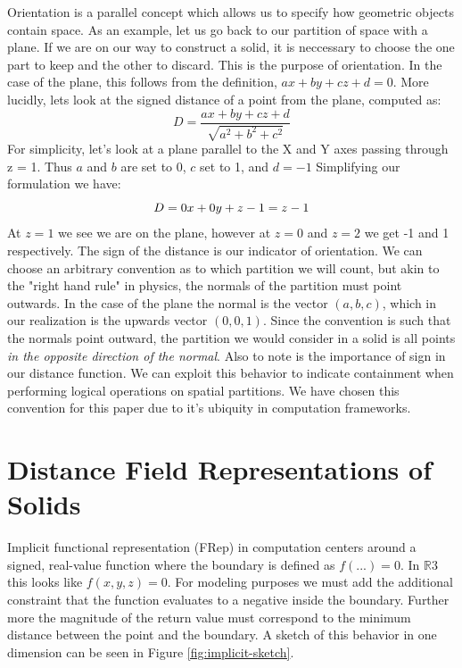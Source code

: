 Orientation is a parallel concept which allows us to specify how geometric
objects contain space. As an example, let us go back to our partition of
space with a plane. If we are on our way to construct a solid, it is
neccessary to choose the one part to keep and the other to discard. This is
the purpose of orientation. In the case of the plane, this follows from the
definition, $ax+by+cz+d=0$. More lucidly, lets look at the signed distance
of a point from the plane, computed as:
\begin{equation}
D = \frac{ax+by+cz+d}{\sqrt{a^2+b^2+c^2}}
\end{equation}
For simplicity, let's look at a plane parallel to the X and Y axes passing
through z = 1. Thus $a$ and $b$ are set to 0, $c$ set to 1, and
$d=-1$
Simplifying our formulation we have:
\begin{equation}
$$ D = 0x+0y+z-1 = z-1$$
\end{equation}
At $z=1$ we see we are on the plane, however at $z=0$ and $z=2$ we get -1 and 1
respectively. The sign of the distance is our indicator of orientation. We can
choose an arbitrary convention as to which partition we will count, but akin
to the "right hand rule" in physics, the normals of the partition must point
outwards. In the case of the plane the normal is the vector $(a,b,c)$, which
in our realization is the upwards vector $(0,0,1)$. Since the convention is
such that the normals point outward, the partition we would consider in a
solid is all points \emph{in the opposite direction of the normal}.
Also to note is the importance of sign in our distance function. We can exploit
this behavior to indicate containment when performing logical operations on
spatial partitions. We have chosen this convention for this paper due to
it's ubiquity in computation frameworks.


\section{Distance Field Representations of Solids}

Implicit functional representation (FRep) in computation centers around a signed, real-value
function where the boundary is defined as $f(...) = 0$.
In $\mathbb{R}3$ this looks like $f(x,y,z) = 0$. For modeling purposes we must add the
additional constraint that the function evaluates to a negative inside the
boundary. Further more the magnitude of the return value must correspond to
the minimum distance between the point and the boundary.\cite{Olah_2011}
A sketch of this behavior in one dimension
can be seen in Figure \ref{fig:implicit-sketch}.

